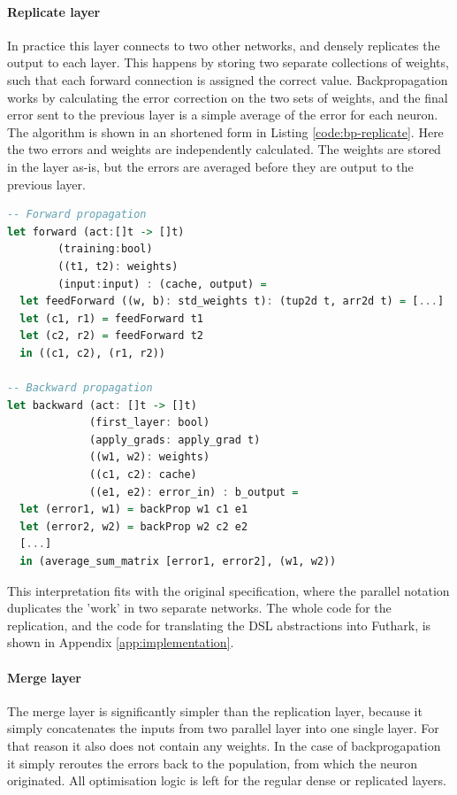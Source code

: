 \paragraph{Replicate layer}
In practice this layer connects to two other networks, and densely
replicates the output to each layer.
This happens by storing two separate collections of weights, such
that each forward connection is assigned the correct value.
Backpropagation works by calculating the error correction on the
two sets of weights, and the final error sent to the previous layer
is a simple average of the error for each neuron. 
The algorithm is shown in an shortened form in Listing \ref{code:bp-replicate}.
Here the two errors and weights are independently calculated.
The weights are stored in the layer as-is, but the errors are 
averaged before they are output to the previous layer.

\begin{lstlisting}[language=Haskell,label={code:bp-replicate},caption={Part
    of the forward and backward propagation algorithms for the replicate layer.
Abbreviated for clarity.}]
-- Forward propagation
let forward (act:[]t -> []t)
	    (training:bool)
	    ((t1, t2): weights)
	    (input:input) : (cache, output) =
  let feedForward ((w, b): std_weights t): (tup2d t, arr2d t) = [...]
  let (c1, r1) = feedForward t1
  let (c2, r2) = feedForward t2
  in ((c1, c2), (r1, r2))

-- Backward propagation
let backward (act: []t -> []t)
             (first_layer: bool)
             (apply_grads: apply_grad t)
             ((w1, w2): weights)
             ((c1, c2): cache)
             ((e1, e2): error_in) : b_output =
  let (error1, w1) = backProp w1 c1 e1
  let (error2, w2) = backProp w2 c2 e2
  [...]
  in (average_sum_matrix [error1, error2], (w1, w2))
\end{lstlisting}

This interpretation fits with the original specification, where
the parallel notation duplicates the 'work' in two separate networks.
The whole code for the replication, and the code for translating the \gls{DSL}
abstractions into Futhark, is shown in Appendix 
\ref{app:implementation}.

\paragraph{Merge layer}
The merge layer is significantly simpler than the replication layer,
because it simply concatenates the inputs from two parallel layer into one single
layer. 
For that reason it also does not contain any weights.
In the case of backprogapation it simply reroutes the errors back to
the population, from which the neuron originated.
All optimisation logic is left for the regular dense or replicated
layers.


